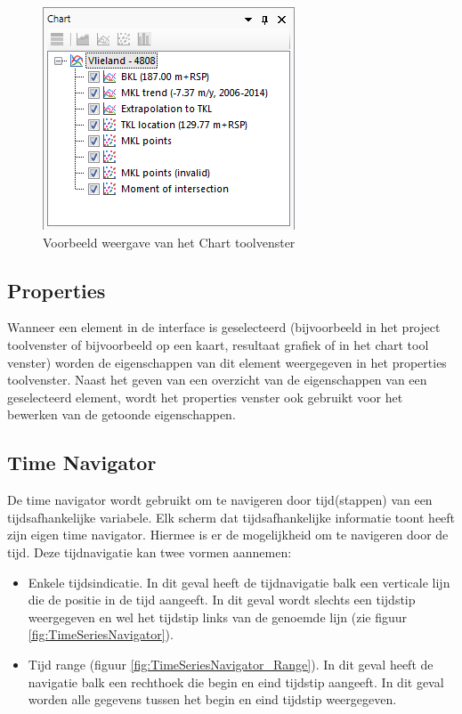\begin{figure}[H]
	\centering
		\includegraphics{figures/chapter_general/Chart_Contents.png}
		\caption{Voorbeeld weergave van het Chart toolvenster}
	\label{fig:3_Chart_Contents}
\end{figure}

\subsection{Properties}
Wanneer een element in de interface is geselecteerd (bijvoorbeeld in het project toolvenster of bijvoorbeeld op een kaart, resultaat grafiek of in het chart tool venster) worden de eigenschappen van dit element weergegeven in het properties toolvenster. Naast het geven van een overzicht van de eigenschappen van een geselecteerd element, wordt het properties venster ook gebruikt voor het bewerken van de getoonde eigenschappen.

\subsection{Time Navigator}
	\label{sec:TimeSeriesNavigator}
De time navigator wordt gebruikt om te navigeren door tijd(stappen) van een tijdsafhankelijke variabele. Elk scherm dat tijdsafhankelijke informatie toont heeft zijn eigen time navigator. Hiermee is er de mogelijkheid om te navigeren door de tijd. Deze tijdnavigatie kan twee vormen aannemen:
\begin{itemize}
\item Enkele tijdsindicatie. In dit geval heeft de tijdnavigatie balk een verticale lijn die de positie in de tijd aangeeft. In dit geval wordt slechts een tijdstip weergegeven en wel het tijdstip links van de genoemde lijn (zie figuur \ref{fig:TimeSeriesNavigator}). 
\item Tijd range (figuur \ref{fig:TimeSeriesNavigator_Range}). In dit geval heeft de navigatie balk een rechthoek die begin en eind tijdstip aangeeft. In dit geval worden alle gegevens tussen het begin en eind tijdstip weergegeven.
\end{itemize}

